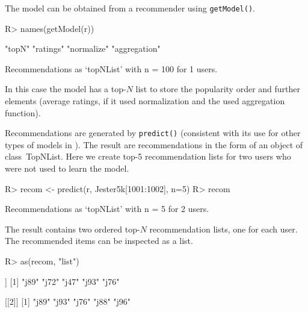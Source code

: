 \documentclass[nojss]{jss}
\newcommand{\class}[1]{\mbox{\textsf{#1}}}
\newcommand{\func}[1]{\mbox{\texttt{#1()}}}
\begin{document}
The model can be obtained from a recommender using \func{getModel}.
\begin{Schunk}
\begin{Sinput}
R> names(getModel(r))
\end{Sinput}
\begin{Soutput}
[1] "topN"        "ratings"     "normalize"   "aggregation"
\end{Soutput}
\begin{Soutput}
Recommendations as ‘topNList’ with n = 100 for 1 users. 
\end{Soutput}
\end{Schunk}

In this case the model has a
top-$N$ list to store the popularity order and further
elements (average ratings, if it used normalization and the
used aggregation function).

Recommendations are generated by \func{predict} 
(consistent with its use for other types of models in 
). The result 
are recommendations in the form of an object of class~\class{TopNList}.
Here we create top-5 recommendation lists for two
users who were not used to learn the model.

\begin{Schunk}
\begin{Sinput}
R> recom <- predict(r, Jester5k[1001:1002], n=5)
R> recom
\end{Sinput}
\begin{Soutput}
Recommendations as ‘topNList’ with n = 5 for 2 users. 
\end{Soutput}
\end{Schunk}

The result contains two ordered top-$N$ recommendation lists,
one for each user. The recommended items can be inspected as a list.
\begin{Schunk}
\begin{Sinput}
R> as(recom, "list")
\end{Sinput}
\begin{Soutput}
[[1]]
[1] "j89" "j72" "j47" "j93" "j76"

[[2]]
[1] "j89" "j93" "j76" "j88" "j96"
\end{Soutput}
\end{Schunk}
\end{document}
